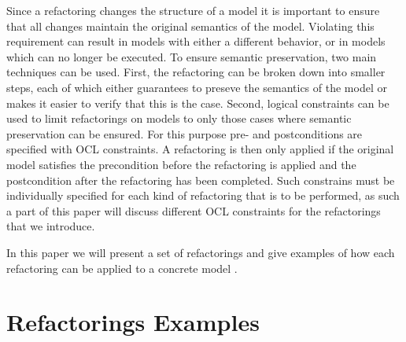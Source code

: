 \documentclass{llncs}
\begin{document}
Since a refactoring changes the structure of a model it is important to ensure that all changes maintain the original 
semantics of the model. Violating this requirement can result in models with either a different behavior, or in models 
which can no longer be executed. To ensure semantic preservation, two main techniques can be used. First, the refactoring 
can be broken down into smaller steps, each of which either guarantees to preseve the semantics of the model or makes it 
easier to verify that this is the case. Second, logical constraints can be used to limit refactorings on models to only 
those cases where semantic preservation can be ensured. For this purpose pre- and postconditions are specified with OCL 
constraints. A refactoring is then only applied if the original model satisfies the precondition before the refactoring is 
applied and the postcondition after the refactoring has been completed. Such constrains must be individually specified for 
each kind of refactoring that is to be performed, as such a part of this paper will discuss different OCL constraints for 
the refactorings that we introduce.

In this paper we will present a set of refactorings and give examples of how each refactoring can be applied to a concrete model .


\section{Refactorings Examples}
\label{refactoring-examples}
\end{document}
